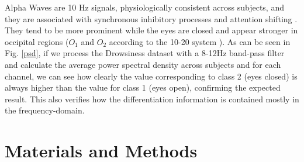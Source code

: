    
Alpha Waves are 10 Hz signals, physiologically consistent across subjects, and they are associated with synchronous inhibitory processes and attention shifting \cite{c3}. They tend to be more prominent while the eyes are closed and appear stronger in occipital regions ($O_1$ and $O_2$ according to the 10-20 system \cite{c6,c11}). As can be seen in Fig. \ref{psd}, if we process the Drowsiness dataset with a 8-12Hz band-pass filter and calculate the average power spectral density across subjects and for each channel, we can see how clearly the value corresponding to class 2 (eyes closed) is always higher than the value for class 1 (eyes open), confirming the expected result.  This also verifies how the differentiation information is contained mostly in the frequency-domain.

   
\section{Materials and Methods}

